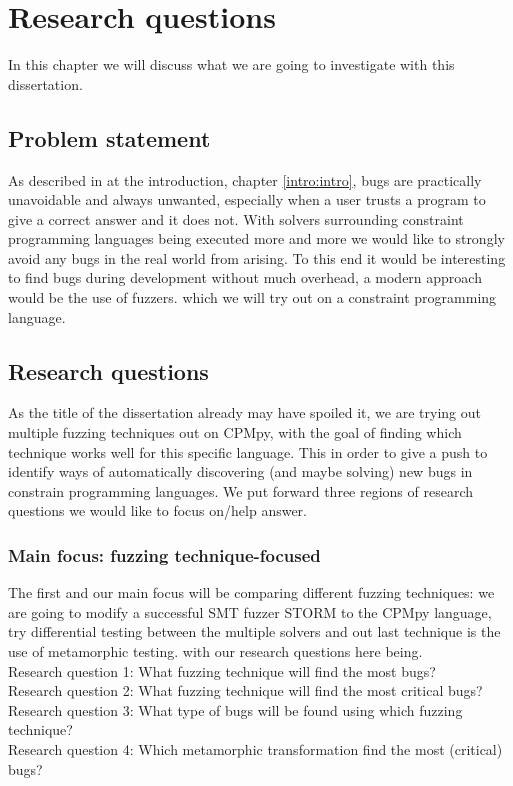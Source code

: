 \chapter{Research questions}
\label{cha:RQ}
\label{RQ:intro}
In this chapter we will discuss what we are going to investigate with this dissertation.

\section{Problem statement}\label{RQ:ProblemStatment}
As described in at the introduction, chapter \ref{intro:intro}, bugs are practically unavoidable and always unwanted, especially when a user trusts a program to give a correct answer and it does not. With solvers surrounding constraint programming languages being executed more and more we would like to strongly avoid any bugs in the real world from arising. To this end it would be interesting to find bugs during development without much overhead, a modern approach would be the use of fuzzers. which we will try out on a constraint programming language.

\section{Research questions}\label{RQ:RQ's}
As the title of the dissertation already may have spoiled it, we are trying out multiple fuzzing techniques out on CPMpy, with the goal of finding which technique works well for this specific language. This in order to give a push to identify ways of automatically discovering (and maybe solving) new bugs in constrain programming languages. We put forward three regions of research questions we would like to focus on/help answer.

\subsection{Main focus: fuzzing technique-focused}
The first and our main focus will be comparing different fuzzing techniques: we are going to modify a successful SMT fuzzer STORM to the CPMpy language, try differential testing between the multiple solvers and out last technique is the use of metamorphic testing. with our research questions here being.
\\
Research question 1: What fuzzing technique will find the most bugs?\\
Research question 2: What fuzzing technique will find the most critical bugs?\\
Research question 3: What type of bugs will be found using which fuzzing technique?\\
Research question 4: Which metamorphic transformation find the most (critical) bugs?\\
